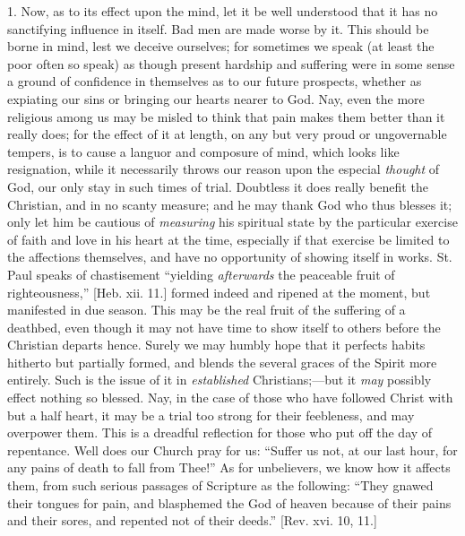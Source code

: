 1. Now, as to its effect upon the mind, let it be well understood
that it has no sanctifying influence in itself. Bad men are made worse
by it. This should be borne in mind, lest we deceive ourselves; for
sometimes we speak (at least the poor often so speak) as though
present hardship and suffering were in some sense a ground of
confidence in themselves as to our future prospects, whether as
expiating our sins or bringing our hearts nearer to God. Nay, even the
more religious among us may be misled to think that pain makes them
better than it really does; for the effect of it at length, on any but
very proud or ungovernable tempers, is to cause a languor and
composure of mind, which looks like resignation, while it necessarily
throws our reason upon the especial \emph{thought} of God, our only
stay in such times of trial. Doubtless it does really benefit the
Christian, and in no scanty measure; and he may thank God who thus
blesses it; only let him be cautious of \emph{measuring} his spiritual
state by the particular exercise of faith and love in his heart at the
time, especially if that exercise be limited to the affections
themselves, and have no opportunity of showing itself in works. St.
Paul speaks of chastisement ``yielding \emph{afterwards} the
peaceable fruit of righteousness,'' [Heb. xii. 11.] formed indeed
and ripened at the moment, but manifested in due season. This may be
the real fruit of the suffering of a deathbed, even though it may not
have time to show itself to others before the Christian departs hence.
Surely we may humbly hope that it perfects habits hitherto but
partially formed, and blends the several graces of the Spirit more
entirely. Such is the issue of it in \emph{established} Christians;—but
it \emph{may} possibly effect nothing so blessed. Nay, in the case of
those who have followed Christ with but a half heart, it may be a
trial too strong for their feebleness, and may overpower them. This is
a dreadful reflection for those who put off the day of repentance.
Well does our Church pray for us: ``Suffer us not, at our last
hour, for any pains of death to fall from Thee!'' As for
unbelievers, we know how it affects them, from such serious passages
of Scripture as the following: ``They gnawed their tongues for
pain, and blasphemed the God of heaven because of their pains and
their sores, and repented not of their deeds.'' [Rev. xvi. 10,
11.]

